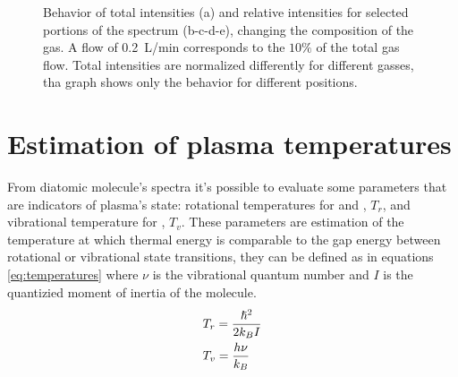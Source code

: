 \begin{figure}
  \hfill
\caption{Behavior of total intensities (a) and relative intensities for selected portions of the spectrum (b-c-d-e), changing the composition of the gas. A flow of \SI{0.2}{\liter/\minute} corresponds to the $\num{10}\%$ of the total gas flow. Total intensities are normalized differently for different gasses, tha graph shows only the behavior for different positions.}
 \label{fig:Irel_flow}
\end{figure}



\section{Estimation of plasma temperatures}
From diatomic molecule's spectra it's possible to evaluate some parameters that are indicators of plasma's state: rotational temperatures for  and , $T_{r}$, and vibrational temperature for , $T_{v}$.
These parameters are estimation of the temperature at which thermal energy is comparable to the gap energy between rotational or vibrational state transitions, they can be defined as in equations \ref{eq:temperatures} where $\nu$ is the vibrational quantum number and $I$ is the quantizied moment of inertia of the molecule.
\begin{equation}
 \centering
 \begin{split}
  &T_{r} = \frac{\hslash^2}{2 k_{B} I}\\
  &T_{v} = \frac{h \nu}{k_{B}}
 \end{split}
 \label{eq:temperatures}
\end{equation}

